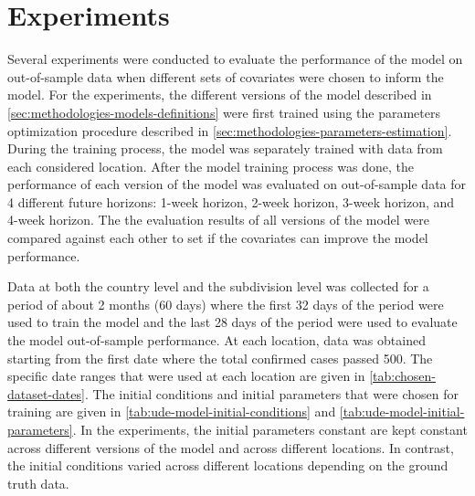 \section{Experiments}
\label{sec:methodologies-experiments}

Several experiments were conducted to evaluate the performance of the model on out-of-sample data when different sets of covariates were chosen to inform the model.
For the experiments, the different versions of the model described in \autoref{sec:methodologies-models-definitions} were first trained using the parameters optimization procedure described in \autoref{sec:methodologies-parameters-estimation}.
During the training process, the model was separately trained with data from each considered location.
After the model training process was done, the performance of each version of the model was evaluated on out-of-sample data for 4 different future horizons: 1-week horizon, 2-week horizon, 3-week horizon, and 4-week horizon.
The the evaluation results of all versions of the model were compared against each other to set if the covariates can improve the model performance.

Data at both the country level and the subdivision level was collected for a period of about 2 months (60 days) where the first 32 days of the period were used to train the model and the last 28 days of the period were used to evaluate the model out-of-sample performance.
At each location, data was obtained starting from the first date where the total confirmed cases passed 500.
The specific date ranges that were used at each location are given in \autoref{tab:chosen-dataset-dates}.
The initial conditions and initial parameters that were chosen for training are given in \autoref{tab:ude-model-initial-conditions} and \autoref{tab:ude-model-initial-parameters}.
In the experiments, the initial parameters constant are kept constant across different versions of the model and across different locations.
In contrast, the initial conditions varied across different locations depending on the ground truth data.

